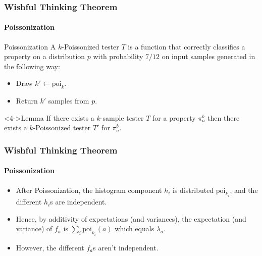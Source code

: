 \documentclass{beamer}
\begin{document}
\begin{frame}
  \frametitle{Wishful Thinking Theorem} \framesubtitle{Poissonization}

  \begin{block}{Poissonization}
    A $k$-Poissonized tester $T$ is a function that correctly
    classifies a property on a distribution $p$ with probability
    $7/12$ on input samples generated in the following way:
    \begin{itemize}
    \item<2-> Draw $k'\leftarrow \mbox{poi}_k$.
    \item<3-> Return $k'$ samples from $p$.
    \end{itemize}
  \end{block}

  \begin{block}<4->{Lemma}
    If there exists a $k$-sample tester $T$ for a property $\pi_a^b$
    then there exists a $k$-Poissonized tester $T'$ for $\pi_a^b$.
  \end{block}
  
\end{frame}

\begin{frame}
  \frametitle{Wishful Thinking Theorem} \framesubtitle{Poissonization}

  
  \begin{itemize}
  \item<1-> After Poissonization, the histogram component $h_i$ is
    distributed $\mbox{poi}_{k_i}$, and the different $h_i$s are independent.
  \item<2-> Hence, by additivity of expectations (and variances), the
    expectation (and variance) of $f_a$ is $\sum_i\mbox{poi}_{k_i}(a)$
    which equals $\lambda_a$.

  \item<3-> However, the different $f_a$s aren't independent.
 \end{itemize}
  
\end{frame}
\end{document}
